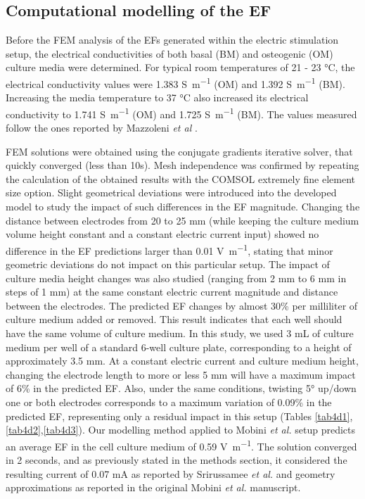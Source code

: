 \subsection{Computational modelling of the \acs{EF}}
Before the \acs{FEM} analysis of the \acs{EF}s generated within the electric stimulation setup, the electrical conductivities of both basal (BM) and osteogenic (OM) culture media were determined. For typical room temperatures of 21 - 23 \si{\celsius}, the electrical conductivity values were 1.383 \si{\siemens\per\meter} (OM) and 1.392 \si{\siemens\per\meter} (BM). Increasing the media temperature to 37 \si{\celsius} also increased its electrical conductivity to 1.741 \si{\siemens\per\meter} (OM) and 1.725 \si{\siemens\per\meter} (BM). The values measured follow the ones reported by Mazzoleni \textit{et al} \cite{Mazzoleni1986-wp}. 

\ac{FEM} solutions were obtained using the conjugate gradients iterative solver, that quickly converged (less than 10s). Mesh independence was confirmed by repeating the calculation of the obtained results with the COMSOL extremely fine element size option. Slight geometrical deviations were introduced into the developed model to study the impact of such differences in the \acs{EF} magnitude. Changing the distance between electrodes from 20  to 25 \si{\milli\meter} (while keeping the culture medium volume height constant and a constant electric current input) showed no difference in the \acs{EF} predictions larger than 0.01 \si{\volt\per\meter}, stating that minor geometric deviations do not impact on this particular setup. The impact of culture media height changes was also studied (ranging from 2 \si{\milli\meter} to 6 \si{\milli\meter} in steps of 1 \si{\milli\meter}) at the same constant electric current magnitude and distance between the electrodes. The predicted \acs{EF} changes by almost 30\si{\percent} per milliliter of culture medium added or removed. This result indicates that each well should have the same volume of culture medium. In this study, we used 3 \si{\milli\liter} of culture medium per well of a standard 6-well culture plate, corresponding to a height of approximately 3.5 \si{\milli\meter}. At a constant electric current and culture medium height, changing the electrode length to more or less 5 \si{\milli\meter} will have a maximum impact of 6\si{\percent} in the predicted \acs{EF}. Also, under the same conditions, twisting 5\si{\degree} up/down one or both electrodes corresponds to a maximum variation of 0.09\si{\percent} in the predicted \acs{EF}, representing only a residual impact in this setup (Tables \ref{tab4d1},\ref{tab4d2},\ref{tab4d3}). Our modelling method applied to Mobini \textit{et al.} \cite{Mobini2016-jh} setup predicts an average \acs{EF} in the cell culture medium of 0.59 \si{\volt\per\meter}. The solution converged in 2 seconds, and as previously stated in the methods section, it considered the resulting current of 0.07 \si{\milli\ampere} as reported by Srirussamee \textit{et al.} \cite{Srirussamee2019-ai} and geometry approximations as reported in the original Mobini \textit{et al.} manuscript. 

